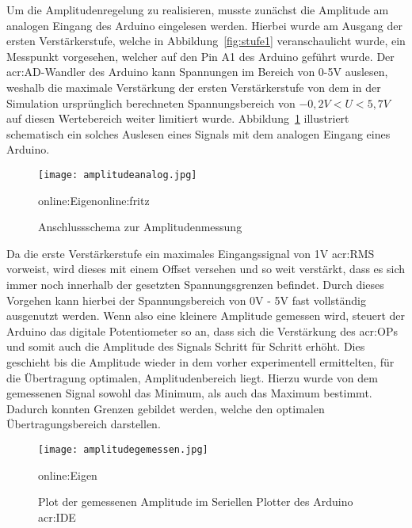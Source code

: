 Um die Amplitudenregelung zu realisieren, musste zunächst die Amplitude am analogen Eingang des Arduino eingelesen werden. Hierbei wurde am Ausgang der ersten Verstärkerstufe, welche in Abbildung~\ref{fig:stufe1} veranschaulicht wurde, ein Messpunkt vorgesehen, welcher auf den Pin A1 des Arduino geführt wurde. Der \gls{acr:AD}-Wandler des Arduino kann Spannungen im Bereich von 0-5V auslesen, weshalb die maximale Verstärkung der ersten Verstärkerstufe von dem in der Simulation ursprünglich berechneten Spannungsbereich von $-0,2V<U<5,7V$ auf diesen Wertebereich weiter limitiert wurde. Abbildung~\ref{fig:amplitudeanalog} illustriert schematisch ein solches Auslesen eines Signals mit dem analogen Eingang eines Arduino. 

\begin{figure}[h]
	\centering
	\texttt{[image: amplitudeanalog.jpg]}
	\caption[Anschlussschema zur Amplitudenmessung]{Anschlussschema zur Amplitudenmessung} 
	\gls{online:Eigen}\gls{online:fritz}
	\label{fig:amplitudeanalog}
\end{figure}

Da die erste Verstärkerstufe ein maximales Eingangssignal von 1V \gls{acr:RMS} vorweist, wird dieses mit einem Offset versehen und so weit verstärkt, dass es sich immer noch innerhalb der gesetzten Spannungsgrenzen befindet. Durch dieses Vorgehen kann hierbei der Spannungsbereich von 0V - 5V fast vollständig ausgenutzt werden. Wenn also eine kleinere Amplitude gemessen wird, steuert der Arduino das digitale Potentiometer so an, dass sich die Verstärkung des \gls{acr:OP}s und somit auch die Amplitude des Signals Schritt für Schritt erhöht. Dies geschieht bis die Amplitude wieder in dem vorher experimentell ermittelten, für die Übertragung optimalen, Amplitudenbereich liegt. Hierzu wurde von dem gemessenen Signal sowohl das Minimum, als auch das Maximum bestimmt. Dadurch konnten Grenzen gebildet werden, welche den optimalen Übertragungsbereich darstellen. 

\begin{figure}[h]
	\centering
	\texttt{[image: amplitudegemessen.jpg]}
	\caption[Plot der gemessenen Amplitude im Seriellen Plotter der Arduino \gls{acr:IDE}]{Plot der gemessenen Amplitude im Seriellen Plotter des Arduino \gls{acr:IDE}} 
	\gls{online:Eigen}
	\label{fig:amplitudegemessen}
\end{figure}

